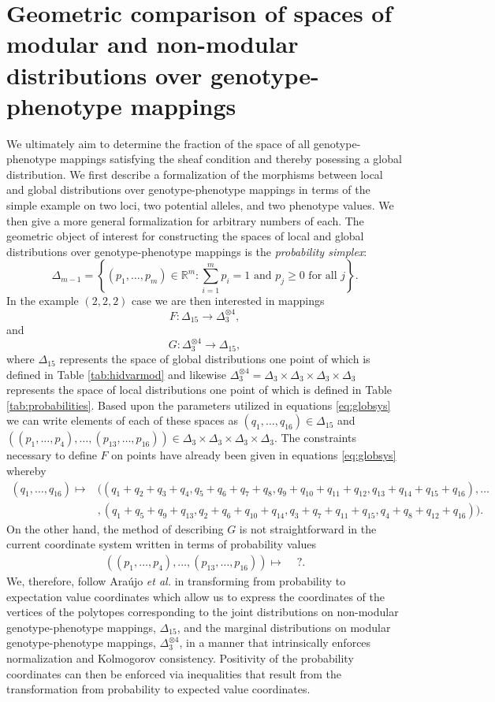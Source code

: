 \section*{Geometric comparison of spaces of modular and non-modular distributions over genotype-phenotype mappings}
We ultimately aim to determine the fraction of the space of all genotype-phenotype mappings satisfying the sheaf condition and thereby posessing a global distribution. We first describe a formalization of the morphisms between local and global distributions over genotype-phenotype mappings in terms of the simple example on two loci, two potential alleles, and two phenotype values. We then give a more general formalization for arbitrary numbers of each. The geometric object of interest for constructing the spaces of local and global distributions over genotype-phenotype mappings is the \emph{probability simplex}:
$$
\Delta_{m-1} = \left\{ (p_1, \ldots , p_m) \in \mathbb{R}^m \colon \sum_{i=1}^m p_i = 1 \text{ and } p_j \geq 0 \text{ for all } j \right\}.
$$
In the example $(2,2,2)$ case we are then interested in mappings
$$
F \colon \Delta_{15} \longrightarrow \Delta_3^{\otimes 4},
$$
and
$$
G \colon	 \Delta_3^{\otimes 4} \longrightarrow \Delta_{15},
$$
where $\Delta_{15}$ represents the space of global distributions one point of which is defined in Table \ref{tab:hidvarmod} and likewise $\Delta_3^{\otimes 4} = \Delta_3 \times \Delta_3 \times \Delta_3 \times \Delta_3$ represents the space of local distributions one point of which is defined in Table \ref{tab:probabilities}. Based upon the parameters utilized in equations \ref{eq:globsys} we can write elements of each of these spaces as $(q_1, \ldots, q_{16}) \in \Delta_{15}$ and $((p_1, \ldots , p_4), \ldots, (p_{13},\ldots,p_{16})) \in \Delta_3 \times \Delta_3 \times \Delta_3 \times \Delta_3$. The constraints necessary to define $F$ on points have already been given in equations \ref{eq:globsys} whereby
\begin{align*}
(q_1, \ldots , q_{16}) \mapsto &((q_1+q_2+q_3+q_4, q_5+q_6+q_7+q_8, q_9+q_{10}+q_{11}+q_{12},q_{13}+q_{14}+q_{15}+q_{16}), \ldots \\
&,(q_1 + q_5 + q_9 + q_{13}, q_2 + q_6 + q_{10} + q_{14}, q_3 + q_7 + q_{11} + q_{15}, q_4 + q_8 + q_{12} + q_{16} ) ).
\end{align*}
On the other hand, the method of describing $G$ is not straightforward in the current coordinate system written in terms of probability values
\begin{align*}
((p_1, \ldots , p_4), \ldots, (p_{13},\ldots,p_{16})) \mapsto & \,\,?.
\end{align*}
We, therefore, follow Ara\'{u}jo {\it et al.} \cite{Araujo2012} in transforming from probability to expectation value coordinates which allow us to express the coordinates of the vertices of the polytopes corresponding to the joint distributions on non-modular genotype-phenotype mappings, $\Delta_{15}$, and the marginal distributions on modular genotype-phenotype mappings, $\Delta_3^{\otimes 4}$, in a manner that intrinsically enforces normalization and Kolmogorov consistency. Positivity of the probability coordinates can then be enforced via inequalities that result from the transformation from probability to expected value coordinates.

